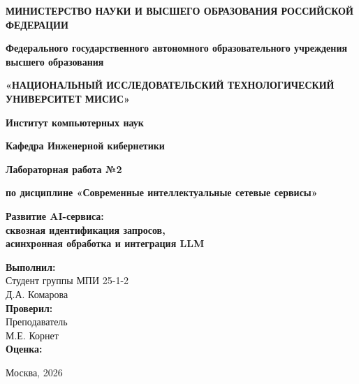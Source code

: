 \documentclass[12pt,a4paper]{article}
\begin{document}
\begin{titlepage}
    \begin{center}
        \textbf{МИНИСТЕРСТВО НАУКИ И ВЫСШЕГО ОБРАЗОВАНИЯ РОССИЙСКОЙ ФЕДЕРАЦИИ}
        \vspace{0.5cm}

        \textbf{Федерального государственного автономного образовательного учреждения \\ высшего образования}
        \vspace{0.3cm}

        \textbf{«НАЦИОНАЛЬНЫЙ ИССЛЕДОВАТЕЛЬСКИЙ ТЕХНОЛОГИЧЕСКИЙ УНИВЕРСИТЕТ МИСИС»}
        \vspace{2cm}

        \textbf{Институт компьютерных наук}
        \vspace{0.3cm}

        \textbf{Кафедра Инженерной кибернетики}
        \vspace{1cm}

        \textbf{Лабораторная работа №2}
        \vspace{0.3cm}

        \textbf{по дисциплине «Современные интеллектуальные сетевые сервисы»}
        \vspace{1.5cm}

        \huge{\textbf{Развитие AI-сервиса: \\ сквозная идентификация запросов, \\ асинхронная обработка и интеграция LLM}}
        \vspace{2cm}
    \end{center}

    \begin{flushright}
        \textbf{Выполнил:} \\
        Студент группы МПИ 25-1-2\\
        Д.А. Комарова \\
        \vspace{0.5cm}
        \textbf{Проверил:} \\
        Преподаватель \\
        М.Е. Корнет \\
        \vspace{2cm}
        \textbf{Оценка:} \hrulefill
    \end{flushright}

    \begin{center}
        \vfill
        Москва, 2026
    \end{center}
\end{titlepage}
\end{document}
